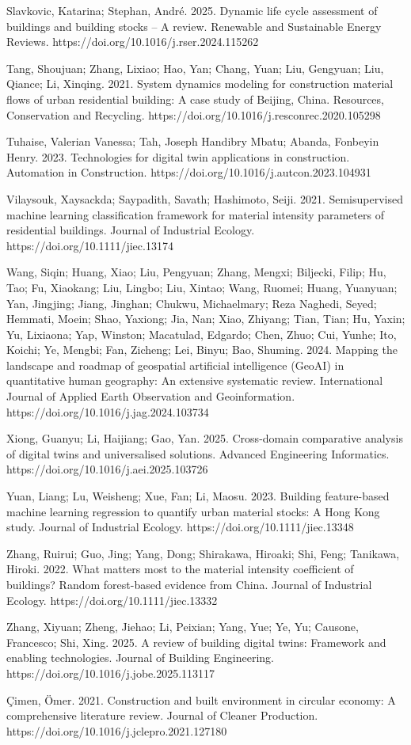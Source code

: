 Slavkovic, Katarina; Stephan, André. 2025. Dynamic life cycle assessment of buildings and building stocks -- A review. Renewable and Sustainable Energy Reviews. https://doi.org/10.1016/j.rser.2024.115262

Tang, Shoujuan; Zhang, Lixiao; Hao, Yan; Chang, Yuan; Liu, Gengyuan; Liu, Qiance; Li, Xinqing. 2021. System dynamics modeling for construction material flows of urban residential building: A case study of Beijing, China. Resources, Conservation and Recycling. https://doi.org/10.1016/j.resconrec.2020.105298

Tuhaise, Valerian Vanessa; Tah, Joseph Handibry Mbatu; Abanda, Fonbeyin Henry. 2023. Technologies for digital twin applications in construction. Automation in Construction. https://doi.org/10.1016/j.autcon.2023.104931

Vilaysouk, Xaysackda; Saypadith, Savath; Hashimoto, Seiji. 2021. Semisupervised machine learning classification framework for material intensity parameters of residential buildings. Journal of Industrial Ecology. https://doi.org/10.1111/jiec.13174

Wang, Siqin; Huang, Xiao; Liu, Pengyuan; Zhang, Mengxi; Biljecki, Filip; Hu, Tao; Fu, Xiaokang; Liu, Lingbo; Liu, Xintao; Wang, Ruomei; Huang, Yuanyuan; Yan, Jingjing; Jiang, Jinghan; Chukwu, Michaelmary; Reza Naghedi, Seyed; Hemmati, Moein; Shao, Yaxiong; Jia, Nan; Xiao, Zhiyang; Tian, Tian; Hu, Yaxin; Yu, Lixiaona; Yap, Winston; Macatulad, Edgardo; Chen, Zhuo; Cui, Yunhe; Ito, Koichi; Ye, Mengbi; Fan, Zicheng; Lei, Binyu; Bao, Shuming. 2024. Mapping the landscape and roadmap of geospatial artificial intelligence (GeoAI) in quantitative human geography: An extensive systematic review. International Journal of Applied Earth Observation and Geoinformation. https://doi.org/10.1016/j.jag.2024.103734

Xiong, Guanyu; Li, Haijiang; Gao, Yan. 2025. Cross-domain comparative analysis of digital twins and universalised solutions. Advanced Engineering Informatics. https://doi.org/10.1016/j.aei.2025.103726

Yuan, Liang; Lu, Weisheng; Xue, Fan; Li, Maosu. 2023. Building feature-based machine learning regression to quantify urban material stocks: A Hong Kong study. Journal of Industrial Ecology. https://doi.org/10.1111/jiec.13348

Zhang, Ruirui; Guo, Jing; Yang, Dong; Shirakawa, Hiroaki; Shi, Feng; Tanikawa, Hiroki. 2022. What matters most to the material intensity coefficient of buildings? Random forest-based evidence from China. Journal of Industrial Ecology. https://doi.org/10.1111/jiec.13332

Zhang, Xiyuan; Zheng, Jiehao; Li, Peixian; Yang, Yue; Ye, Yu; Causone, Francesco; Shi, Xing. 2025. A review of building digital twins: Framework and enabling technologies. Journal of Building Engineering. https://doi.org/10.1016/j.jobe.2025.113117

Çimen, Ömer. 2021. Construction and built environment in circular economy: A comprehensive literature review. Journal of Cleaner Production. https://doi.org/10.1016/j.jclepro.2021.127180

